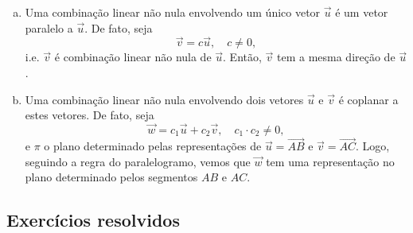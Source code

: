 \begin{obs}
  \begin{enumerate}[a)]
  \item Uma combinação linear não nula envolvendo um único vetor $\vec{u}$ é um vetor paralelo a $\vec{u}$. De fato, seja
    \begin{equation}
      \vec{v} = c\vec{u},\quad c\neq 0,
    \end{equation}
    i.e. $\vec{v}$ é combinação linear não nula de $\vec{u}$. Então, $\vec{v}$ tem a mesma direção de $\vec{u}$.
  \item Uma combinação linear não nula envolvendo dois vetores $\vec{u}$ e $\vec{v}$ é coplanar a estes vetores. De fato, seja
    \begin{equation}
      \vec{w} = c_1\vec{u} + c_2\vec{v},\quad c_1\cdot c_2 \neq 0,
    \end{equation}
    e $\pi$ o plano determinado pelas representações de $\vec{u} = \overrightarrow{AB}$ e $\vec{v} = \overrightarrow{AC}$. Logo, seguindo a regra do paralelogramo, vemos que $\vec{w}$ tem uma representação no plano determinado pelos segmentos $AB$ e $AC$.
  \end{enumerate}
\end{obs}

\subsection*{Exercícios resolvidos}

